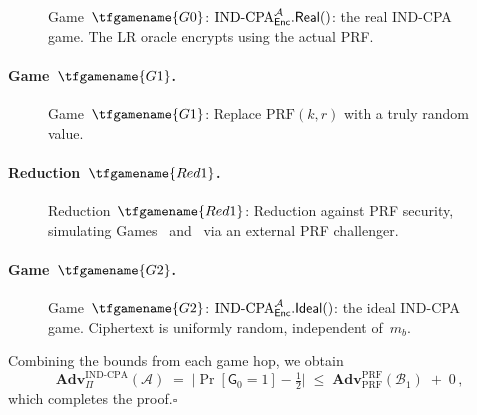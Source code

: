 \documentclass{article}
\begin{document}
\begin{figure}[ht]
\centering

\caption{Game~$\tfgamename{G0}$: $\mathrm{IND\text{-}CPA}_{\mathsf{Enc}}^{\mathcal{A}}.\mathsf{Real}()$: the real IND-CPA game. The LR oracle encrypts using the actual PRF.}
\label{fig:G0}
\end{figure}

\paragraph{Game~$\tfgamename{G1}$.}


\begin{figure}[ht]
\centering

\caption{Game~$\tfgamename{G1}$: Replace $\mathrm{PRF}(k, r)$ with a truly random value.}
\label{fig:G1}
\end{figure}

\paragraph{Reduction~$\tfgamename{Red1}$.}


\begin{figure}[ht]
\centering

\caption{Reduction~$\tfgamename{Red1}$: Reduction against PRF security, simulating Games~ and~ via an external PRF challenger.}
\label{fig:Red1}
\end{figure}

\paragraph{Game~$\tfgamename{G2}$.}


\begin{figure}[ht]
\centering

\caption{Game~$\tfgamename{G2}$: $\mathrm{IND\text{-}CPA}_{\mathsf{Enc}}^{\mathcal{A}}.\mathsf{Ideal}()$: the ideal IND-CPA game. Ciphertext is uniformly random, independent of~$m_b$.}
\label{fig:G2}
\end{figure}

\noindent
Combining the bounds from each game hop, we obtain
\[
  \mathbf{Adv}^{\mathrm{IND\text{-}CPA}}_\Pi(\mathcal{A})
  \;=\;
  \bigl|\Pr[\mathsf{G}_0 = 1] - \tfrac{1}{2}\bigr|
  \;\leq\;
  \mathbf{Adv}^{\mathrm{PRF}}_{\mathrm{PRF}}(\mathcal{B}_1)
  \;+\; 0 \,,
\]
which completes the proof.\hfill$\square$
\end{document}
